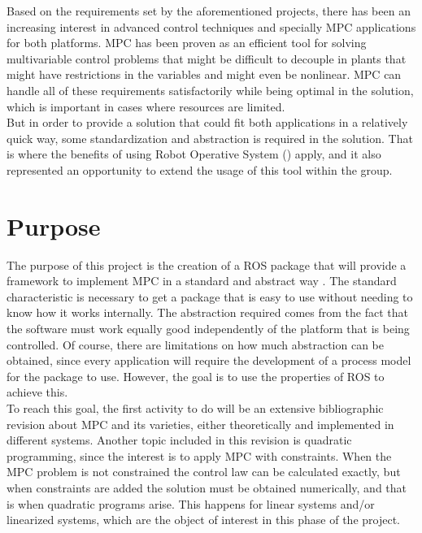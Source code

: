 Based on the requirements set by the aforementioned projects, there has been an increasing interest in advanced control techniques and specially MPC applications for both platforms. MPC has been proven as an efficient tool for solving multivariable control problems that might be difficult to decouple in plants that might have restrictions in the variables and might even be nonlinear. MPC can handle all of these requirements satisfactorily while being optimal in the solution, which is important in cases where resources are limited.\\




But in order to provide a solution that could fit both applications in a relatively quick way, some standardization and abstraction is required in the solution. That is where the benefits of using Robot Operative System () apply, and it also represented an opportunity to extend the usage of this tool within the group.


\section{Purpose}

The purpose of this project is the creation of a ROS package that will provide a framework to implement MPC in a standard and abstract way . The standard characteristic is necessary to get a package that is easy to use without needing to know how it works internally. The abstraction required comes from the fact that the software must work equally good independently of the platform that is being controlled. Of course, there are limitations on how much abstraction can be obtained, since every application will require the development of a process model for the package to use. However, the goal is to use the properties of ROS to achieve this.\\

To reach this goal, the first activity to do will be an extensive bibliographic revision about MPC and its varieties, either theoretically and implemented in different systems. Another topic included in this revision is quadratic programming, since the interest is to apply MPC with constraints. When the MPC problem is not constrained the control law can be calculated exactly, but when constraints are added the solution must be obtained numerically, and that is when quadratic programs arise. This happens for linear systems and/or linearized systems, which are the object of interest in this phase of the project.\\

